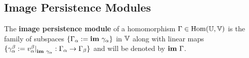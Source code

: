 
\subsection{Image Persistence Modules}

\begin{definition}
  The \textbf{image persistence module} of a homomorphism $\Gamma\in\mathrm{Hom}(\mathbb{U},\mathbb{V})$ is the family of subspaces $\{\Gamma_\alpha :=\mathbf{im}~\gamma_\alpha\}$ in $\mathbb{V}$ along with linear maps $\{\gamma_\alpha^\beta := v_\alpha^\beta\mathord{\mid}_{\mathbf{im}~\gamma_\alpha} : \Gamma_\alpha\to\Gamma_\beta\}$ and will be denoted by $\mathbf{im}~\Gamma$.
\end{definition}

